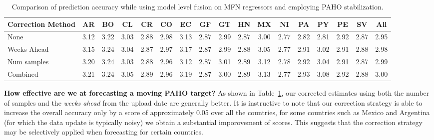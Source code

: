 \begin{table}[tb!]
  \centering
  \caption{\label{tb:moving} Comparison of prediction accuracy while using model level fusion 
  on MFN regressors and employing PAHO stabilization.}
\vspace{1em}
\begin{tabular}{|p{1.5cm}|*{16}{c|}}
\hline
Correction Method& AR & BO & CL & CR & CO & EC & GF & GT & HN & MX & NI & PA & PY & PE & SV & All\\
\hline \hline
None             &3.12&3.22&3.03&2.88&2.98&3.13&2.87&2.99&2.87&3.00&2.77&2.82&2.81&2.92&2.87&2.95\\ \hline
Weeks Ahead      &3.15&3.24&3.04&2.87&2.97&3.17&2.87&2.99&2.88&3.05&2.77&2.91&3.02&2.91&2.88&2.98\\ \hline 
Num samples      &3.20&3.24&3.03&2.88&2.96&3.12&2.87&3.01&2.89&3.12&2.78&2.92&3.04&2.91&2.87&2.99\\ \hline
Combined         &3.21&3.24&3.05&2.89&2.96&3.19&2.87&3.00&2.89&3.13&2.77&2.93&3.08&2.92&2.88&3.00\\ 
\hline
\end{tabular}
\end{table}


{\noindent \textbf{How effective are we at forecasting a moving PAHO target?}} 
As shown in Table~\ref{tb:moving}, 
our
corrected estimates 
using both the number of samples and 
the {\it weeks ahead} from the upload date are generally better. It is instructive to note that
our correction strategy is
able to increase the overall accuracy only by a score of approximately 0.05 over all the countries, 
for some countries such as Mexico and Argentina (for which the data update is typically noisy) we obtain 
a substantial imporovement of scores. This suggests that the correction strategy may be selectively applied 
when forecasting for certain countries. 


